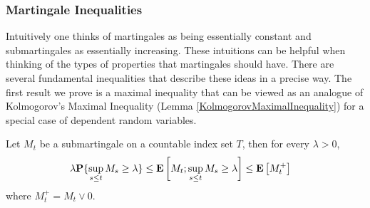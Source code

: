 \subsubsection{Martingale Inequalities}
Intuitively one thinks of martingales as being essentially constant
and submartingales as essentially increasing.  These intuitions can be
helpful when thinking of the types of properties that martingales
should have.  There are several fundamental inequalities that describe
these ideas  in a precise way.  The first result we prove is a maximal
inequality that can be viewed as an analogue of Kolmogorov's Maximal
Inequality (Lemma \ref{KolmogorovMaximalInequality}) for a special
case of dependent random variables.
\begin{lem}\label{DoobMaximalInequalityDiscrete}Let $M_t$ be a
  submartingale on a countable index set $T$, then for every $\lambda > 0$, 
\begin{align*}
\lambda \textbf{P}\{\sup_{s \leq t} M_s \geq \lambda\} &\leq
\textbf{E}\left[M_t ; \sup_{s \leq t} M_s  \geq \lambda\right] \leq \textbf{E}\left[M_t^+\right]
\end{align*}
where $M_t^+ = M_t \vee 0$.
\end{lem}
